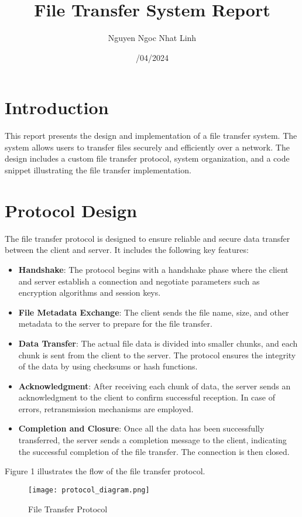 \documentclass{article}
\title{File Transfer System Report}
\author{Nguyen Ngoc Nhat Linh}
\date{\24/04/2024}
\begin{document}
\maketitle

\section{Introduction}
This report presents the design and implementation of a file transfer system. The system allows users to transfer files securely and efficiently over a network. The design includes a custom file transfer protocol, system organization, and a code snippet illustrating the file transfer implementation.

\section{Protocol Design}
The file transfer protocol is designed to ensure reliable and secure data transfer between the client and server. It includes the following key features:

\begin{itemize}
  \item \textbf{Handshake}: The protocol begins with a handshake phase where the client and server establish a connection and negotiate parameters such as encryption algorithms and session keys.
  \item \textbf{File Metadata Exchange}: The client sends the file name, size, and other metadata to the server to prepare for the file transfer.
  \item \textbf{Data Transfer}: The actual file data is divided into smaller chunks, and each chunk is sent from the client to the server. The protocol ensures the integrity of the data by using checksums or hash functions.
  \item \textbf{Acknowledgment}: After receiving each chunk of data, the server sends an acknowledgment to the client to confirm successful reception. In case of errors, retransmission mechanisms are employed.
  \item \textbf{Completion and Closure}: Once all the data has been successfully transferred, the server sends a completion message to the client, indicating the successful completion of the file transfer. The connection is then closed.
\end{itemize}

Figure 1 illustrates the flow of the file transfer protocol.

\begin{figure}[h]
  \centering
  \texttt{[image: protocol\_diagram.png]}
  \caption{File Transfer Protocol}
  \label{fig:protocol}
\end{figure}
\end{document}
